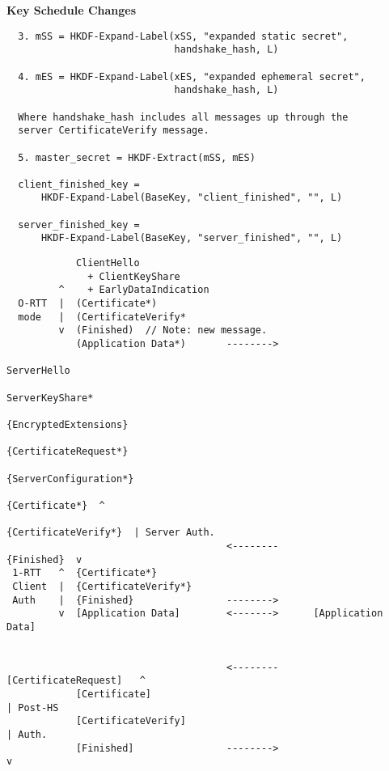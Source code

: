 \documentclass[helvetica]{seminar}
\newcommand{\heading}[1]{%
  \begin{center} 
    \large\bf 
    #1 
  \end{center} 
  \vspace{.4 in}}
\begin{document}
\begin{slide}
\heading{Key Schedule Changes}

\begin{footnotesize}
\begin{verbatim}
  3. mSS = HKDF-Expand-Label(xSS, "expanded static secret",
                             handshake_hash, L)

  4. mES = HKDF-Expand-Label(xES, "expanded ephemeral secret",
                             handshake_hash, L)

  Where handshake_hash includes all messages up through the
  server CertificateVerify message.

  5. master_secret = HKDF-Extract(mSS, mES)

  client_finished_key =
      HKDF-Expand-Label(BaseKey, "client_finished", "", L)
  
  server_finished_key =
      HKDF-Expand-Label(BaseKey, "server_finished", "", L)
\end{verbatim}
\end{footnotesize}
\end{slide}

\begin{slide}
\begin{scriptsize}
\begin{verbatim}
            ClientHello
              + ClientKeyShare
         ^    + EarlyDataIndication
  O-RTT  |  (Certificate*)
  mode   |  (CertificateVerify*
         v  (Finished)  // Note: new message.
            (Application Data*)       -------->
                                                            ServerHello
                                                        ServerKeyShare*
                                                  {EncryptedExtensions}
                                                  {CertificateRequest*}
                                                 {ServerConfiguration*} 
                                                         {Certificate*}  ^
                                                   {CertificateVerify*}  | Server Auth.
                                      <--------              {Finished}  v
 1-RTT   ^  {Certificate*}
 Client  |  {CertificateVerify*}
 Auth    |  {Finished}                -------->
         v  [Application Data]        <------->      [Application Data]

                         
                                      <--------    [CertificateRequest]   ^
            [Certificate]                                                 | Post-HS
            [CertificateVerify]                                           | Auth.
            [Finished]                -------->                           v
\end{verbatim}
\end{scriptsize}
\end{slide}
\end{document}
